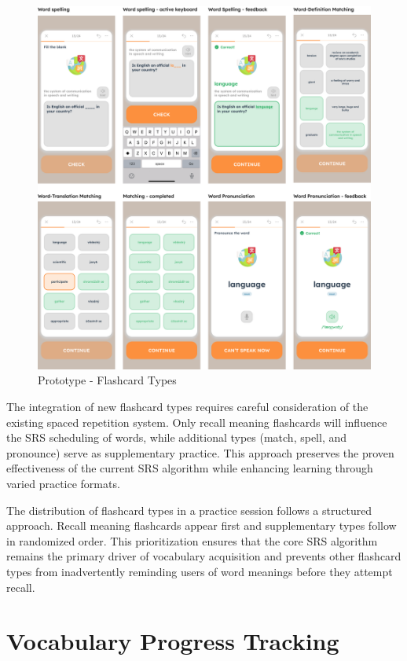 \newpage
\begin{figure}[!h]
    \includegraphics[width=1\textwidth]{src/figures/em-prototype-flashcards.png}
    \caption{Prototype - Flashcard Types}
    \label{fig:em-prototype-flashcard-types}
\end{figure}

The integration of new flashcard types requires careful consideration of the existing spaced repetition system. Only recall meaning flashcards will influence the SRS scheduling of words, while additional types (match, spell, and pronounce) serve as supplementary practice. This approach preserves the proven effectiveness of the current SRS algorithm while enhancing learning through varied practice formats.

The distribution of flashcard types in a practice session follows a structured approach. Recall meaning flashcards appear first and supplementary types follow in randomized order. This prioritization ensures that the core SRS algorithm remains the primary driver of vocabulary acquisition and prevents other flashcard types from inadvertently reminding users of word meanings before they attempt recall.

\section{Vocabulary Progress Tracking}

